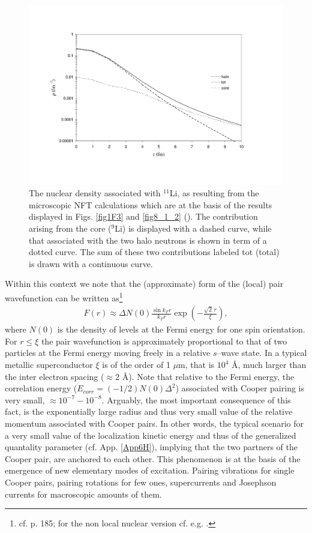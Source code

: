 \begin{figure}
\centerline{\includegraphics*[width=15cm,angle=0]{nutshell/figs/fig3_2_2.pdf}}
\caption{The nuclear density associated with $^{11}$Li, as resulting from the microscopic NFT calculations which are at the basis of the results displayed in Figs. \ref{fig1F3} and \ref{fig8_1_2} (\cite{Barranco:01}). The contribution arising from the core ($^{9}$Li) is displayed with a dashed curve, while that associated with the two halo neutrons is shown in term of a dotted curve. The sum of these two contributions  labeled tot (total) is drawn with a continuous curve.}\label{fig3.2.2}
\end{figure}
Within this context we note that the (approximate) form of the (local) pair wavefunction can be written as\footnote{cf. \cite{Leggett:06} p. 185; for the non local nuclear version cf. e.g. \cite{Broglia:83c}.}
\begin{align}\label{eq4.3.2}
F(r)\approx\Delta N(0)\frac{\sin k_F r}{k_Fr}\exp\left(-\frac{\sqrt{2}\,r}{\xi}\right),
\end{align}
where $N(0)$ is the density of levels at the Fermi energy for one spin orientation. For $r\leq\xi$ the pair wavefunction is approximately proportional to that of two particles at the Fermi energy moving freely in a relative $s$--wave state. In a typical metallic superconductor $\xi$ is of the order of 1 $\mu$m, that is $10^4$ \AA, much larger than the inter electron spacing ($\approx 2$ \AA). Note that relative to the Fermi energy, the correlation energy ($E_{corr}=(-1/2)N(0)\Delta^2$) associated with Cooper pairing is very small, $\approx 10^{-7}-10^{-8}$. Arguably, the most important consequence of this fact, is the exponentially large radius and thus very small value of the relative momentum associated with Cooper pairs. In other words, the typical scenario for a very small value of the localization kinetic energy and thus of the generalized quantality parameter (cf. App. \ref{App6H}), implying that the two partners of the Cooper pair, are  anchored to each other. This phenomenon is at the basis  of the emergence of new elementary modes of excitation. Pairing vibrations for single Cooper pairs, pairing rotations for few ones, supercurrents and Josephson currents for macroscopic amounts of them.



